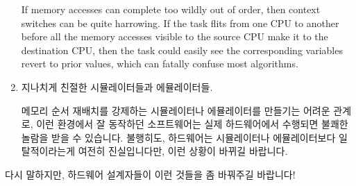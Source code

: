 \begin{enumerate}
	If memory accesses can complete too wildly out of order,
	then context switches can be quite harrowing.
	If the task flits from one CPU to another before all the
	memory accesses visible to the source CPU make it to the
	destination CPU, then the task could easily see the corresponding
	variables revert to prior values, which can fatally confuse
	most algorithms.
\fi
\item	지나치게 친절한 시뮬레이터들과 에뮬레이터들.

	메모리 순서 재배치를 강제하는 시뮬레이터나 에뮬레이터를 만들기는 어려운
	관계로, 이런 환경에서 잘 동작하던 소프트웨어는 실제 하드웨어에서
	수행되면 불쾌한 놀람을 받을 수 있습니다.
	불행히도, 하드웨어는 시뮬레이터나 에뮬레이터보다 일탈적이라는게 여전히
	진실입니다만, 이런 상황이 바뀌길 바랍니다.

\end{enumerate}

다시 말하지만, 하드웨어 설계자들이 이런 것들을 좀 바꿔주길 바랍니다!

